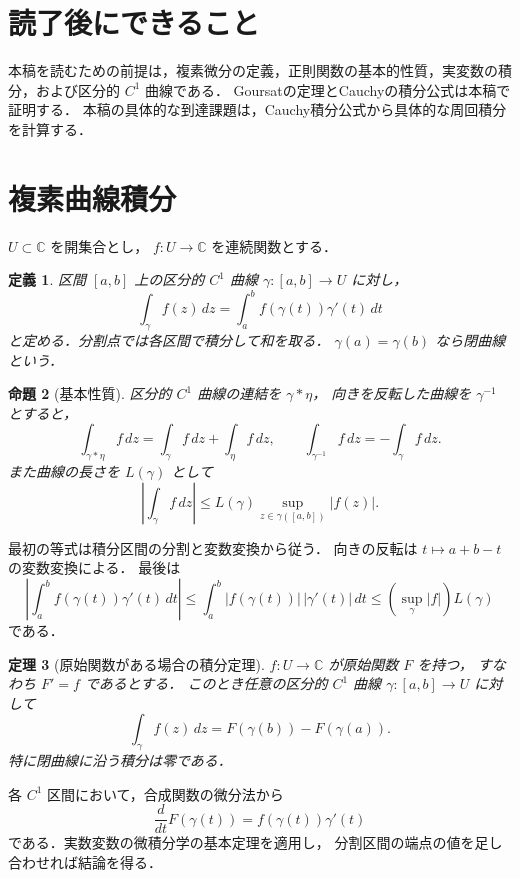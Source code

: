 \documentclass[a5paper,10pt,onecolumn]{jsarticle}
\makeatletter
\theoremstyle{mathnotetheorem}
\newtheorem{theorem}{定理}[section]
\newtheorem{definition}[theorem]{定義}
\newtheorem{proposition}[theorem]{命題}
\renewcommand{\proofname}{証明}
\renewenvironment{proof}[1][\proofname]{%
  \par\pushQED{\qed}\normalfont\topsep4\p@\@plus2\p@\relax
  \trivlist\item[\hskip\labelsep\bfseries #1]\ignorespaces
}{\popQED\endtrivlist\@endpefalse}
\makeatother
\begin{document}
\section*{読了後にできること}
本稿を読むための前提は，複素微分の定義，正則関数の基本的性質，実変数の積分，および区分的 $C^1$ 曲線である．
Goursatの定理とCauchyの積分公式は本稿で証明する．
本稿の具体的な到達課題は，Cauchy積分公式から具体的な周回積分を計算する．

\section{複素曲線積分}

$U\subset\mathbb C$ を開集合とし，
$f:U\to\mathbb C$ を連続関数とする．
\begin{definition}
区間 $[a,b]$ 上の区分的 $C^1$ 曲線
$\gamma:[a,b]\to U$ に対し，
\[
 \int_\gamma f(z)\,dz
 =\int_a^b f(\gamma(t))\gamma'(t)\,dt
\]
と定める．分割点では各区間で積分して和を取る．
$\gamma(a)=\gamma(b)$ なら閉曲線という．
\end{definition}

\begin{proposition}[基本性質]\label{prop:path-basic}
区分的 $C^1$ 曲線の連結を $\gamma*\eta$，
向きを反転した曲線を $\gamma^{-1}$ とすると，
\[
 \int_{\gamma*\eta}f\,dz
 =\int_\gamma f\,dz+\int_\eta f\,dz,\qquad
 \int_{\gamma^{-1}}f\,dz=-\int_\gamma f\,dz.
\]
また曲線の長さを $L(\gamma)$ として
\[
 \left|\int_\gamma f\,dz\right|
 \le L(\gamma)\sup_{z\in\gamma([a,b])}|f(z)|.
\]
\end{proposition}
\begin{proof}
最初の等式は積分区間の分割と変数変換から従う．
向きの反転は $t\mapsto a+b-t$ の変数変換による．
最後は
\[
 \left|\int_a^bf(\gamma(t))\gamma'(t)\,dt\right|
 \le\int_a^b|f(\gamma(t))|\,|\gamma'(t)|\,dt
 \le\left(\sup_{\gamma}|f|\right)L(\gamma)
\]
である．
\end{proof}

\begin{theorem}[原始関数がある場合の積分定理]\label{thm:primitive}
$f:U\to\mathbb C$ が原始関数 $F$ を持つ，
すなわち $F'=f$ であるとする．
このとき任意の区分的 $C^1$ 曲線 $\gamma:[a,b]\to U$
に対して
\[
 \int_\gamma f(z)\,dz=F(\gamma(b))-F(\gamma(a)).
\]
特に閉曲線に沿う積分は零である．
\end{theorem}
\begin{proof}
各 $C^1$ 区間において，合成関数の微分法から
\[
 \frac d{dt}F(\gamma(t))=f(\gamma(t))\gamma'(t)
\]
である．実数変数の微積分学の基本定理を適用し，
分割区間の端点の値を足し合わせれば結論を得る．
\end{proof}
\end{document}
